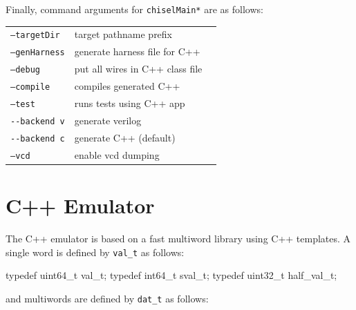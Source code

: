 \documentclass[10pt,twocolumn]{article}
\def\code#1{{\small\tt #1}}
\begin{document}
Finally, command arguments for \code{chiselMain*} are as follows: \\

\begin{tabular}{lll}
\code{--targetDir} & target pathname prefix \\
\code{--genHarness} & generate harness file for C++ \\
\code{--debug} & put all wires in C++ class file \\
\code{--compile} & compiles generated C++ \\
\code{--test} & runs tests using C++ app \\
\verb+--backend v+ & generate verilog \\ 
\verb+--backend c+ & generate C++ (default)\\
\code{--vcd} & enable vcd dumping \\
\end{tabular}


\section{C++ Emulator}

The C++ emulator is based on a fast multiword library using
C++ templates.  
A single word is defined by \code{val\_t} as follows: 

\begin{cpp}
typedef uint64_t val_t;
typedef int64_t sval_t; 
typedef uint32_t half_val_t;
\end{cpp}

\noindent
and multiwords are defined by \code{dat\_t} as follows:
\end{document}
